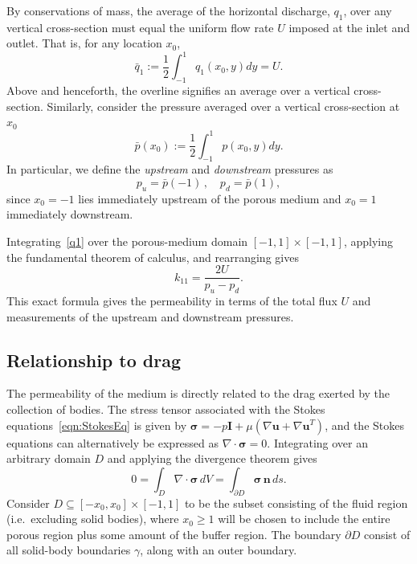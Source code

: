 \documentclass[3p]{elsarticle}
\newcommand{\grad}{{\nabla}}
\newcommand{\nn}{{\mathbf{n}}}
\newcommand{\uu}{{\mathbf{u}}}
\newcommand{\bvec}[1]{\mathbf{#1}}
\newcommand {\bq} {\bvec{q}}
\newcommand{\qavg}{\bar{q}}
\newcommand{\pavg}{\bar{p}}
\newcommand{\pup}{p_u}
\newcommand{\pdn}{p_d}
\newcommand{\stress}{{\boldsymbol \sigma}}
\begin{document}
By conservations of mass, the average of the horizontal discharge, $q_1$, over any vertical cross-section must equal the uniform flow rate $U$ imposed at the inlet and outlet. That is, for any location $x_0$,
\begin{equation}
\qavg_1 := \frac{1}{2} \int_{-1}^{1} q_1(x_0, y) dy = U.
\end{equation}
Above and henceforth, the overline signifies an average over a vertical cross-section. Similarly, consider the pressure averaged over a vertical cross-section at $x_0$
\begin{equation}
  \pavg(x_0) := \frac{1}{2} \int_{-1}^{1} p(x_0, y) dy.
\end{equation}
In particular, we define the {\em upstream} and {\em downstream} pressures as
\begin{equation}
  \pup = \pavg(-1) \, , \quad \pdn = \pavg(1),
\end{equation}
since $x_0 = -1$ lies immediately upstream of the porous medium and $x_0 = 1$ immediately downstream.

Integrating~\eqref{q1} over the porous-medium domain $[-1, 1] \times [-1,1]$, applying the fundamental theorem of calculus, and rearranging gives
\begin{equation}
  \label{eqn:k11}
  k_{11} = \frac{2U}{\pup - \pdn}.
\end{equation}
This exact formula gives the permeability in terms of the total flux $U$
and measurements of the upstream and downstream pressures.

 

\subsection{Relationship to drag}

The permeability of the medium is directly related to the drag exerted by the collection of bodies. The stress tensor associated with the Stokes equations~\eqref{eqn:StokesEq} is given by $\stress = -p \bvec{I} + \mu \left( \grad \uu + \grad \uu^T \right)$, and the Stokes equations can alternatively be expressed as $\grad \cdot \stress = 0$. Integrating over an arbitrary domain $D$ and applying the divergence theorem gives
\begin{equation}
  \label{divthm}
  0 = \int_{D} \grad \cdot \stress \, dV
  = \int_{\partial D} \stress \, \nn \, ds.
\end{equation}
Consider $D \subseteq [-x_0, x_0] \times [-1, 1]$ to be the subset consisting of the fluid region (i.e.~excluding solid bodies), where $x_0 \ge 1$ will be chosen to include the entire porous region plus some amount of the buffer region. The boundary $\partial D$ consist of all solid-body boundaries $\gamma$, along with an outer boundary. 
\end{document}

